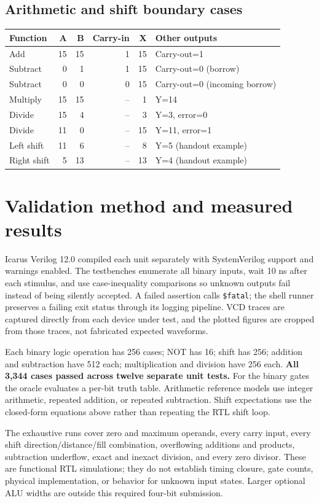 \documentclass[11pt]{article}
\begin{document}
\subsection{Arithmetic and shift boundary cases}
\begin{center}
\begin{tabular}{lrrrrl}
Function&A&B&Carry-in&X&Other outputs\\\hline
Add&15&15&1&15&Carry-out=1\\
Subtract&0&1&1&15&Carry-out=0 (borrow)\\
Subtract&0&0&0&15&Carry-out=0 (incoming borrow)\\
Multiply&15&15&--&1&Y=14\\
Divide&15&4&--&3&Y=3, error=0\\
Divide&11&0&--&15&Y=11, error=1\\
Left shift&11&6&--&8&Y=5 (handout example)\\
Right shift&5&13&--&13&Y=4 (handout example)
\end{tabular}
\end{center}

\section{Validation method and measured results}
Icarus Verilog 12.0 compiled each unit separately with SystemVerilog support and warnings enabled. The testbenches enumerate all binary inputs, wait 10 ns after each stimulus, and use case-inequality comparisons so unknown outputs fail instead of being silently accepted. A failed assertion calls \texttt{\$fatal}; the shell runner preserves a failing exit status through its logging pipeline. VCD traces are captured directly from each device under test, and the plotted figures are cropped from those traces, not fabricated expected waveforms.

Each binary logic operation has 256 cases; NOT has 16; shift has 256; addition and subtraction have 512 each; multiplication and division have 256 each. \textbf{All 3,344 cases passed across twelve separate unit tests.} For the binary gates the oracle evaluates a per-bit truth table. Arithmetic reference models use integer arithmetic, repeated addition, or repeated subtraction. Shift expectations use the closed-form equations above rather than repeating the RTL shift loop.

The exhaustive runs cover zero and maximum operands, every carry input, every shift direction/distance/fill combination, overflowing additions and products, subtraction underflow, exact and inexact division, and every zero divisor. These are functional RTL simulations; they do not establish timing closure, gate counts, physical implementation, or behavior for unknown input states. Larger optional ALU widths are outside this required four-bit submission.
\end{document}
